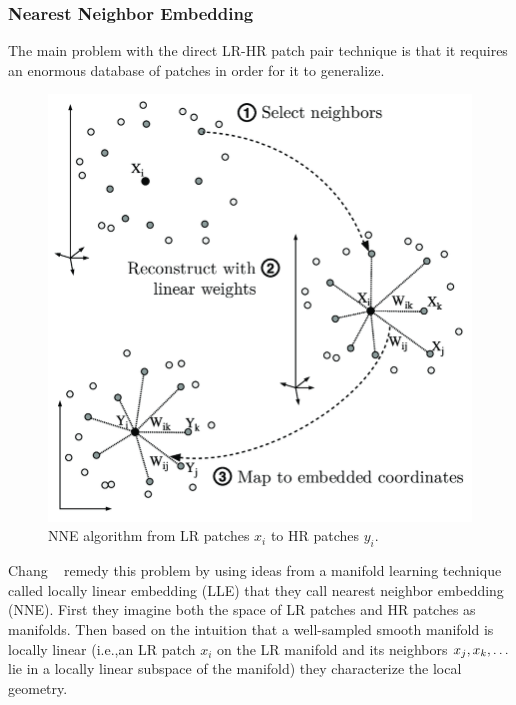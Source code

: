 \subsubsection{Nearest Neighbor Embedding}
The main problem with the direct LR-HR patch pair technique is that it requires an enormous database of patches in order for it to generalize.
%
\begin{figure}
    \centering
    \includegraphics[width=\linewidth,keepaspectratio]{figures/classical/lle.png}
    \caption{NNE algorithm from LR patches \(x_i\) to HR patches \(y_i\)\cite{Guillermophdthesis}.}
    \label{fig:lle}
\end{figure}
Chang \etal~ remedy this problem by using ideas from a manifold learning technique called locally linear embedding\cite{saul2000introduction} (LLE) that they call nearest neighbor embedding (NNE).
%
First they imagine both the space of LR patches and HR patches as manifolds.
%
Then based on the intuition that a well-sampled smooth manifold is locally linear (i.e.,an LR patch \(x_i\) on the LR manifold and its neighbors \(x_j, x_k, \mathellipsis\) lie in a locally linear subspace of the manifold) they characterize the local geometry.
%
